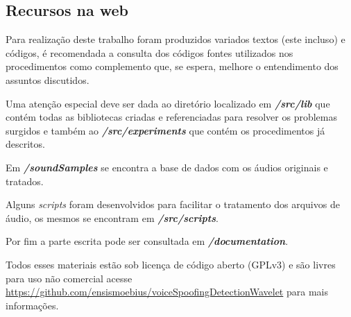 \begin{apendicesenv}
	\chapter{Recursos na web}
		\par Para realização deste trabalho foram produzidos variados textos (este incluso) e códigos, é recomendada a consulta dos códigos fontes utilizados nos procedimentos como complemento que, se espera, melhore o entendimento dos assuntos discutidos.
		
		\par Uma atenção especial deve ser dada ao diretório localizado em \textit{\textbf{/src/lib}} que contém todas as bibliotecas criadas e referenciadas para resolver os problemas surgidos e também ao \textit{\textbf{/src/experiments}} que contém os procedimentos já descritos.
				
		\par Em \textit{\textbf{/soundSamples}} se encontra a base de dados com os áudios originais e tratados.
		
		\par Alguns \textit{scripts} foram desenvolvidos para facilitar o tratamento dos arquivos de áudio, os mesmos se encontram em \textbf{\textit{/src/scripts}}.
		
		\par Por fim a parte escrita pode ser consultada em \textit{\textbf{/documentation}}.
		
		\par Todos esses materiais estão sob licença de código aberto (GPLv3) e são livres para uso não comercial acesse   \href{https://github.com/ensismoebius/voiceSpoofingDetectionWavelet}{https://github.com/ensismoebius/voiceSpoofingDetectionWavelet} para mais informações.
\end{apendicesenv}